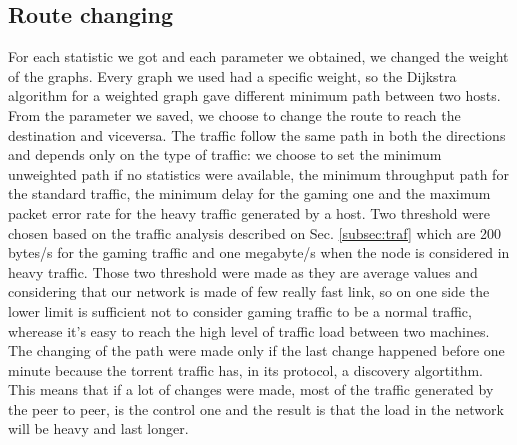 \documentclass[conference,10pt]{IEEEtran}
\begin{document}
\subsection{Route changing} %
For each statistic we got and each parameter we obtained, we changed the weight of the graphs. Every graph we used had a specific weight, so the
Dijkstra algorithm for a weighted graph gave different minimum path between two hosts. From the parameter we saved, we choose to change the
route to reach the destination and viceversa. The traffic follow the same path in both the directions and depends only on the type of traffic:
we choose to set the minimum unweighted path if no statistics were available, the minimum throughput path for the standard traffic, the minimum
delay for the gaming one and the maximum packet error rate for the heavy traffic generated by a host.
Two threshold were chosen based on the traffic analysis described on Sec. \ref{subsec:traf} which are 200 bytes/s for the gaming traffic and one megabyte/s
when the node is considered in heavy traffic. Those two threshold were made as they are average values and considering that our network is made of few really fast link,
so on one side the lower limit is sufficient not to consider gaming traffic to be a normal traffic, wherease it's easy to reach the high level of traffic load between two machines.
The changing of the path were made only if the last change happened before one minute because the torrent traffic has, in its protocol, a discovery
algortithm. This means that if a lot of changes were made, most of the traffic generated by the peer to peer, is the control one and the result is that the
load in the network will be heavy and last longer.
\end{document}
